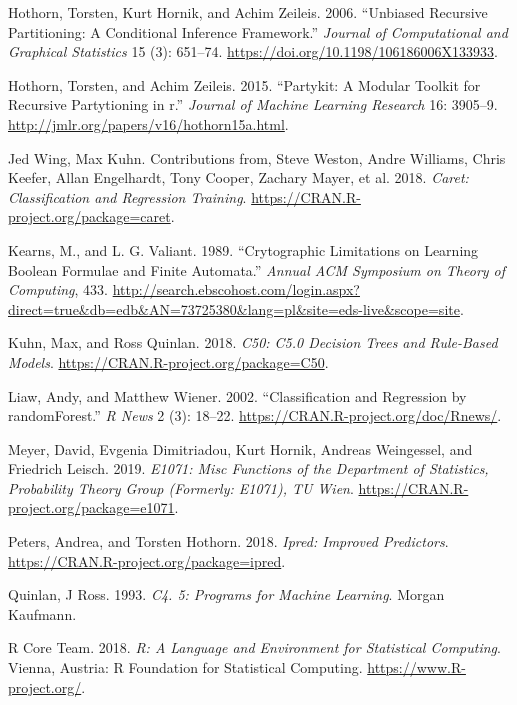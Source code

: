\documentclass[
]{book}
\newlength{\cslhangindent}
\newenvironment{CSLReferences}[2] %
 {\begin{list}{}{%
  \setlength{\itemindent}{0pt}
  \setlength{\leftmargin}{0pt}
  \setlength{\parsep}{0pt}
  \ifodd #1
   \setlength{\leftmargin}{\cslhangindent}
   \setlength{\itemindent}{-1\cslhangindent}
  \fi
  \setlength{\itemsep}{#2\baselineskip}}}
 {\end{list}}
\theoremstyle{plain}
\theoremstyle{definition}
\theoremstyle{definition}
\theoremstyle{definition}
\theoremstyle{definition}
\theoremstyle{definition}
\theoremstyle{remark}
\begin{document}
\begin{CSLReferences}{1}{0}
Hothorn, Torsten, Kurt Hornik, and Achim Zeileis. 2006. {``Unbiased Recursive Partitioning: A Conditional Inference Framework.''} \emph{Journal of Computational and Graphical Statistics} 15 (3): 651--74. \url{https://doi.org/10.1198/106186006X133933}.

Hothorn, Torsten, and Achim Zeileis. 2015. {``Partykit: A Modular Toolkit for Recursive Partytioning in r.''} \emph{Journal of Machine Learning Research} 16: 3905--9. \url{http://jmlr.org/papers/v16/hothorn15a.html}.

Jed Wing, Max Kuhn. Contributions from, Steve Weston, Andre Williams, Chris Keefer, Allan Engelhardt, Tony Cooper, Zachary Mayer, et al. 2018. \emph{Caret: Classification and Regression Training}. \url{https://CRAN.R-project.org/package=caret}.

Kearns, M., and L. G. Valiant. 1989. {``Crytographic Limitations on Learning {Boolean} Formulae and Finite Automata.''} \emph{Annual ACM Symposium on Theory of Computing}, 433. \url{http://search.ebscohost.com/login.aspx?direct=true&db=edb&AN=73725380&lang=pl&site=eds-live&scope=site}.

Kuhn, Max, and Ross Quinlan. 2018. \emph{C50: C5.0 Decision Trees and Rule-Based Models}. \url{https://CRAN.R-project.org/package=C50}.

Liaw, Andy, and Matthew Wiener. 2002. {``Classification and Regression by randomForest.''} \emph{R News} 2 (3): 18--22. \url{https://CRAN.R-project.org/doc/Rnews/}.

Meyer, David, Evgenia Dimitriadou, Kurt Hornik, Andreas Weingessel, and Friedrich Leisch. 2019. \emph{E1071: Misc Functions of the Department of Statistics, Probability Theory Group (Formerly: E1071), TU Wien}. \url{https://CRAN.R-project.org/package=e1071}.

Peters, Andrea, and Torsten Hothorn. 2018. \emph{Ipred: Improved Predictors}. \url{https://CRAN.R-project.org/package=ipred}.

Quinlan, J Ross. 1993. \emph{C4. 5: {Programs} for {Machine Learning}}. {Morgan Kaufmann}.

R Core Team. 2018. \emph{R: A Language and Environment for Statistical Computing}. Vienna, Austria: R Foundation for Statistical Computing. \url{https://www.R-project.org/}.


\end{CSLReferences}
\end{document}

